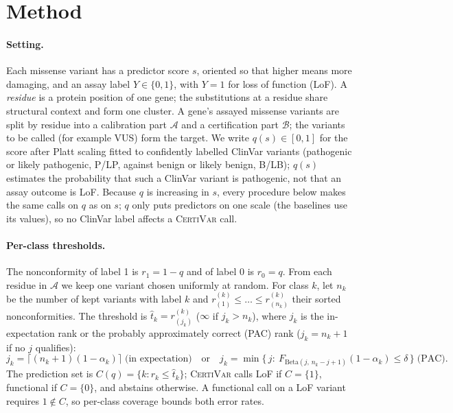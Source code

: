 \section{Method}\label{sec:method}

\paragraph{Setting.}
Each missense variant has a predictor score $s$, oriented so that higher means more damaging, and an assay label
$Y\in\{0,1\}$, with $Y=1$ for loss of function (LoF). A \emph{residue} is a protein position of one gene; the
substitutions at a residue share structural context and form one cluster. A gene's assayed missense variants are split
by residue into a calibration part $\mathcal A$ and a certification part $\mathcal B$; the variants to be called (for
example VUS) form the target. We write $q(s)\in[0,1]$ for the score after Platt scaling \cite{Platt1999} fitted to
confidently labelled ClinVar variants (pathogenic or likely pathogenic, P/LP, against benign or likely benign, B/LB);
$q(s)$ estimates the probability that such a ClinVar variant is pathogenic, not that an assay outcome is LoF. Because $q$
is increasing in $s$, every procedure below makes the same calls on $q$ as on $s$; $q$ only puts predictors on one
scale (the baselines use its values), so no ClinVar label affects a \textsc{CertiVar} call.

\paragraph{Per-class thresholds.}
The nonconformity of label 1 is $r_1=1-q$ and of label 0 is $r_0=q$. From each residue in $\mathcal A$ we keep one
variant chosen uniformly at random. For class $k$, let $n_k$ be the number of kept variants with label $k$ and
$r^{(k)}_{(1)}\le\dots\le r^{(k)}_{(n_k)}$ their sorted nonconformities. The threshold is $\hat t_k=r^{(k)}_{(j_k)}$
($\infty$ if $j_k>n_k$), where $j_k$ is the in-expectation rank or the probably approximately correct (PAC) rank
($j_k=n_k+1$ if no $j$ qualifies):
\begin{equation}\label{eq:rank}
j_k=\bigl\lceil (n_k+1)(1-\alpha_k)\bigr\rceil \;\text{(in expectation)}\quad\text{or}\quad
j_k=\min\bigl\{\,j:\ F_{\mathrm{Beta}(j,\,n_k-j+1)}(1-\alpha_k)\le\delta\,\bigr\}\;\text{(PAC)}.
\end{equation}
The prediction set is $C(q)=\{k: r_k\le \hat t_k\}$; \textsc{CertiVar} calls LoF if $C=\{1\}$, functional if $C=\{0\}$,
and abstains otherwise. A functional call on a LoF variant requires $1\notin C$, so per-class coverage bounds both
error rates.

